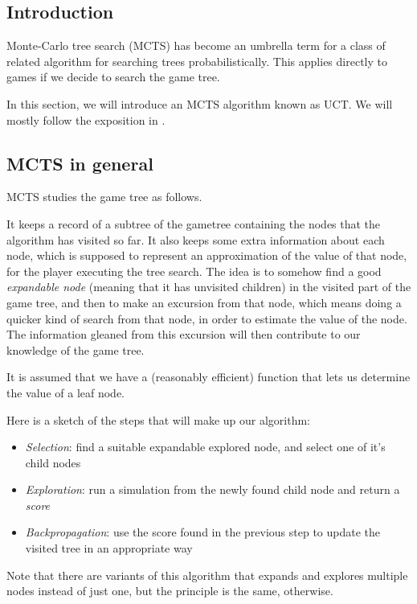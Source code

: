 \subsection {Introduction}


Monte-Carlo tree search (MCTS) has become an umbrella term for a class of related algorithm for searching trees probabilistically.
This applies directly to games if we decide to search the game tree.

In this section, we will introduce an MCTS algorithm known as UCT.
We will mostly follow the exposition in \citep{mcts_survey12}.

\subsection {MCTS in general}

MCTS studies the game tree as follows.

It keeps a record of a subtree of the gametree containing the nodes that the algorithm has visited so far.
It also keeps some extra information about each node, which is supposed to represent an approximation of the value of that node, for the player executing the tree search.
The idea is to somehow find a good \emph{expandable node} (meaning that it has unvisited children) in the visited part of the game tree, and then to make an excursion from that node, which means doing a quicker kind of search from that node, in order to estimate the value of the node. The information gleaned from this excursion will then contribute to our knowledge of the game tree.

It is assumed that we have a (reasonably efficient) function that lets us determine the value of a leaf node.

Here is a sketch of the steps that will make up our algorithm:

\begin{itemize}
\item \emph{Selection}: find a suitable expandable explored node, and select one of it's child nodes
\item \emph{Exploration}: run a simulation from the newly found child node and return a \emph{score}
\item \emph{Backpropagation}: use the score found in the previous step to update the visited tree in an appropriate way
\end{itemize}

Note that there are variants of this algorithm that expands and explores multiple nodes instead of just one, but the principle is the same, otherwise.

